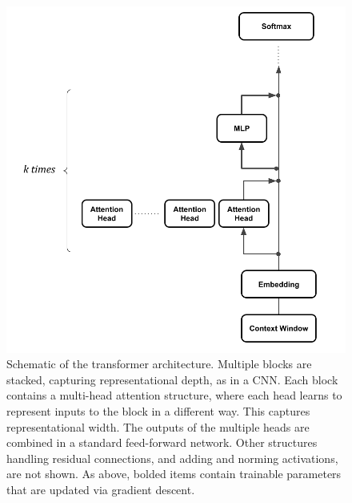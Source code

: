 \begin{figure}[ht]
\centering
\includegraphics[scale=.35]{./images/transformerBlockMultiHeadResidualStream.png}
\caption[Jeff Yoshimi with consultation from Tim Meyer.]{Schematic of the
transformer architecture. Multiple blocks are stacked, capturing
representational depth, as in a CNN. Each block contains a multi-head attention
structure, where each head learns to represent inputs to the block in a
different way. This captures representational width. The outputs of the
multiple heads are combined in a standard feed-forward network. Other
structures handling residual connections, and adding and norming activations,
are not shown. As above, bolded items contain trainable parameters that are
updated via gradient descent.
}
\label{multipleHeads}
\end{figure}
 
